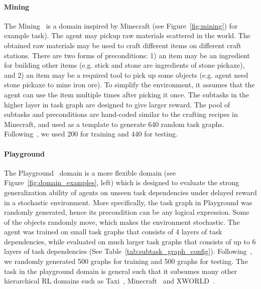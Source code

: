 \documentclass{article} \usepackage{iclr2020_conference,times}
\newcommand{\cutparagraphup}{\vspace{-2pt}}
\begin{document}
\cutparagraphup
\paragraph{Mining} The Mining~\citep{sohn2018hierarchical} is a domain inspired by Minecraft (see Figure~\ref{fig:mining}) for example task).
The agent may pickup raw materials scattered in the world. The obtained raw materials may be used to craft different items on different craft stations. There are two forms of preconditions: 1) an item may be an ingredient for building other items (e.g. stick and stone are ingredients of stone pickaxe), and 2) an item may be a required tool to pick up some objects (e.g. agent need stone pickaxe to mine iron ore).
To simplify the environment, it assumes that the agent can use the item multiple times after picking it once.
The subtasks in the higher layer in task graph are designed to give larger reward. The pool of subtasks and preconditions are hand-coded similar to the crafting recipes in Minecraft, and used as a template to generate 640 random task graphs. Following~\citep{sohn2018hierarchical}, we used 200 for training and 440 for testing.

\cutparagraphup
\paragraph{Playground} The Playground~\citep{sohn2018hierarchical} domain is a more flexible domain (see Figure~\ref{fig:domain_examples}, left) which is designed to evaluate the strong generalization ability of agents on unseen task dependencies under delayed reward in a stochastic environment. More specifically, the task graph in Playground was randomly generated, hence its precondition can be any logical expression. Some of the objects randomly move, which makes the environment stochastic. The agent was trained on small task graphs that consists of 4 layers of task dependencies, while evaluated on much larger task graphs that consists of up to 6 layers of task dependencies (See Table~\ref{tab:subtask_graph_config}). Following~\citep{sohn2018hierarchical}, we randomly generated 500 graphs for training and 500 graphs for testing. The task in the playground domain is general such that it subsumes many other hierarchical RL domains such as Taxi~\citep{taxi}, Minecraft~\citep{oh2017zero} and XWORLD~\citep{yu2017deep}.
\end{document}
